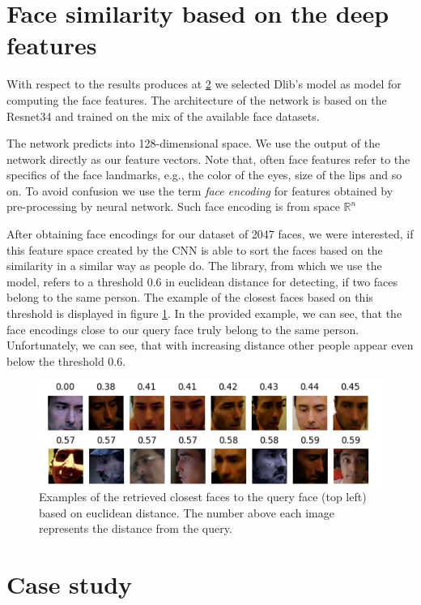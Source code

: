 \section{Face similarity based on the deep features}

With respect to the results produces at \ref{}\todo{} we selected Dlib's model as model for computing the face features. The architecture of the network is based on the Resnet34 and trained on the mix of the available face datasets.

The network predicts into 128-dimensional space. We use the output of the network directly as our feature vectors. Note that, often face features refer to the specifics of the face landmarks, e.g., the color of the eyes, size of the lips and so on. To avoid confusion we use the term \emph{face encoding} for features obtained by pre-processing by neural network. Such face encoding is from space $\mathbb{R}^n$

After obtaining face encodings for our dataset of 2047 faces, we were interested, if this feature space created by the CNN is able to sort the faces based on the similarity in a similar way as people do. The library, from which we use the model, refers to a threshold 0.6 in euclidean distance for detecting, if two faces belong to the same person. The example of the closest faces based on this threshold is displayed in  figure \ref{fig:closest_faces}. In the provided example, we can see, that the face encodings close to our query face truly belong to the same person. Unfortunately, we can see, that with increasing distance other people appear even below the threshold 0.6.


\begin{figure}
    \centering
    \includegraphics[width=\linewidth]{img/man_closest_faces.pdf}
    \caption{Examples of the retrieved closest faces to the query face (top left) based on euclidean distance. The number above each image represents the distance from the query.}
    \label{fig:closest_faces}
\end{figure}

\section{Case study}

